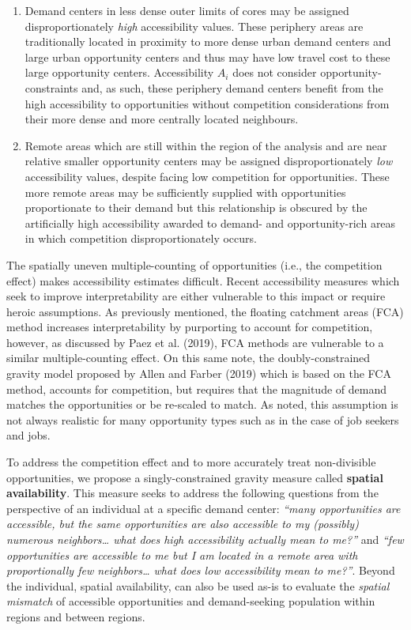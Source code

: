 \documentclass[]{elsarticle} %
\begin{document}
\begin{enumerate}
\def\labelenumi{\arabic{enumi})}
\item
  Demand centers in less dense outer limits of cores may be assigned
  disproportionately \emph{high} accessibility values. These periphery
  areas are traditionally located in proximity to more dense urban
  demand centers and large urban opportunity centers and thus may have
  low travel cost to these large opportunity centers. Accessibility
  \(A_i\) does not consider opportunity-constraints and, as such, these
  periphery demand centers benefit from the high accessibility to
  opportunities without competition considerations from their more dense
  and more centrally located neighbours.
\item
  Remote areas which are still within the region of the analysis and are
  near relative smaller opportunity centers may be assigned
  disproportionately \emph{low} accessibility values, despite facing low
  competition for opportunities. These more remote areas may be
  sufficiently supplied with opportunities proportionate to their demand
  but this relationship is obscured by the artificially high
  accessibility awarded to demand- and opportunity-rich areas in which
  competition disproportionately occurs.
\end{enumerate}

The spatially uneven multiple-counting of opportunities (i.e., the
competition effect) makes accessibility estimates difficult. Recent
accessibility measures which seek to improve interpretability are either
vulnerable to this impact or require heroic assumptions. As previously
mentioned, the floating catchment areas (FCA) method increases
interpretability by purporting to account for competition, however, as
discussed by Paez et al. (2019), FCA methods are vulnerable to a similar
multiple-counting effect. On this same note, the doubly-constrained
gravity model proposed by Allen and Farber (2019) which is based on the
FCA method, accounts for competition, but requires that the magnitude of
demand matches the opportunities or be re-scaled to match. As noted,
this assumption is not always realistic for many opportunity types such
as in the case of job seekers and jobs.

To address the competition effect and to more accurately treat
non-divisible opportunities, we propose a singly-constrained gravity
measure called \textbf{spatial availability}. This measure seeks to
address the following questions from the perspective of an individual at
a specific demand center: \emph{``many opportunities are accessible, but
the same opportunities are also accessible to my (possibly) numerous
neighbors\ldots{} what does high accessibility actually mean to me?''}
and \emph{``few opportunities are accessible to me but I am located in a
remote area with proportionally few neighbors\ldots{} what does low
accessibility mean to me?''}. Beyond the individual, spatial
availability, can also be used as-is to evaluate the \emph{spatial
mismatch} of accessible opportunities and demand-seeking population
within regions and between regions.
\end{document}
